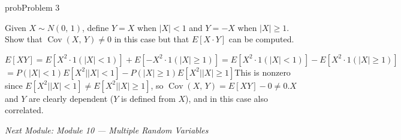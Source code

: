 \begin{PSbox}[unbreakable]{prob}{Problem 3}

Given $X \sim N(0,\,1)$, define $Y = X$ when $\lvert X\rvert < 1$ and $Y = -X$ when $\lvert X\rvert \ge 1$. Show that $\operatorname{Cov}(X,\,Y) \ne 0$ in this case but that $E[X \cdot Y]$ can be computed.

\PSsolution{} $E[XY] = E[X^{2} \cdot 1(\lvert X\rvert < 1)] + E[-X^{2} \cdot 1(\lvert X\rvert \ge 1)] = E[X^{2} \cdot 1(\lvert X\rvert < 1)] - E[X^{2} \cdot 1(\lvert X\rvert \ge 1)]$\PSbr{}$= P(\lvert X\rvert < 1)E[X^{2}\lvert \rvert X \mid < 1] - P(\lvert X\rvert \ge 1)E[X^{2}\lvert \rvert X \mid \ge 1]$\PSbr{}This is nonzero since $E[X^{2}\lvert \rvert X \mid < 1] \ne E[X^{2}\lvert \rvert X \mid \ge 1]$, so $\operatorname{Cov}(X,\,Y) = E[XY] - 0 \ne 0$.\PSbr{}$X$ and $Y$ are clearly dependent ($Y$ is defined from $X$), and in this case also correlated.

\emph{Next Module: {Module 10 — Multiple Random Variables}}

\end{PSbox}
